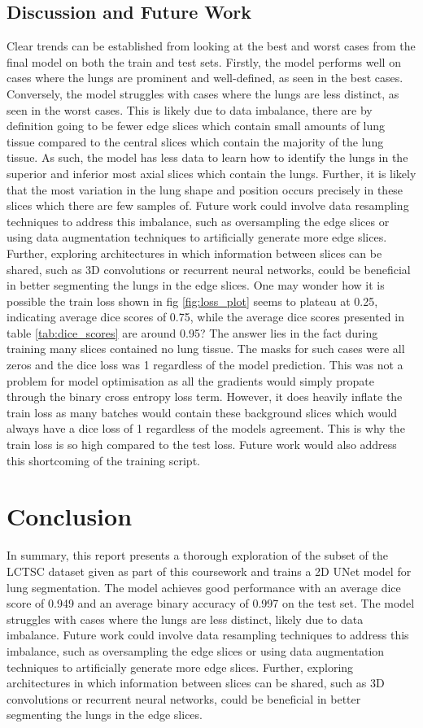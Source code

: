 \documentclass[11pt]{article}
\begin{document}
\subsection{Discussion and Future Work}
Clear trends can be established from looking at the best and worst cases from the final model on both the train and test sets.
Firstly, the model performs well on cases where the lungs are prominent and well-defined, as seen in the best cases. Conversely, the model struggles with cases where the lungs are less distinct, as seen in the worst cases. This is likely due to data imbalance, there are by definition going to be fewer edge slices which contain small amounts of lung tissue compared to the central slices which contain the majority of the lung tissue. As such, the model has less data to learn how to identify the lungs in the superior and inferior most axial slices which contain the lungs. Further, it is likely that the most variation in the lung shape and position occurs precisely in these slices which there are few samples of. Future work could involve data resampling techniques to address this imbalance, such as oversampling the edge slices or using data augmentation techniques to artificially generate more edge slices. Further, exploring architectures in which information between slices can be shared, such as 3D convolutions or recurrent neural networks, could be beneficial in better segmenting the lungs in the edge slices.
One may wonder how it is possible the train loss shown in fig \ref{fig:loss_plot} seems to plateau at 0.25, indicating average dice scores of 0.75, while the average dice scores presented in table \ref{tab:dice_scores} are around 0.95? The answer lies in the fact during training many slices contained no lung tissue. The masks for such cases were all zeros and the dice loss was 1 regardless of the model prediction. This was not a problem for model optimisation as all the gradients would simply propate through the binary cross entropy loss term. However, it does heavily inflate the train loss as many batches would contain these background slices which would always have a dice loss of 1 regardless of the models agreement. This is why the train loss is so high compared to the test loss. Future work would also address this shortcoming of the training script.


\section{Conclusion}
In summary, this report presents a thorough exploration of the subset of the LCTSC dataset given as part of this coursework and trains a 2D UNet model for lung segmentation. The model achieves good performance with an average dice score of 0.949 and an average binary accuracy of 0.997 on the test set. The model struggles with cases where the lungs are less distinct, likely due to data imbalance. Future work could involve data resampling techniques to address this imbalance, such as oversampling the edge slices or using data augmentation techniques to artificially generate more edge slices. Further, exploring architectures in which information between slices can be shared, such as 3D convolutions or recurrent neural networks, could be beneficial in better segmenting the lungs in the edge slices.
\end{document}
